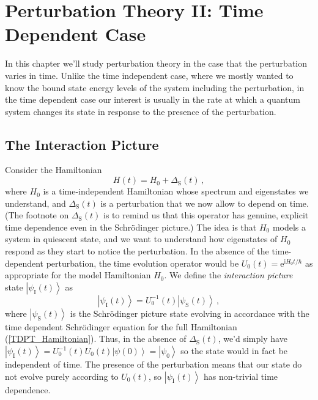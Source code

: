 \documentclass{article}
\theoremstyle{plain}\theoremheaderfont{\normalfont\itshape}\theorembodyfont{\rmfamily}\theoremseparator{.}\newtheorem*{rem}{Remark}\newtheorem*{ex}{Example}\newtheorem*{proof}{Proof}\newtheorem*{altp}{Alternative proof}
\theoremstyle{plain}\theoremheaderfont{\normalfont\bfseries}\theorembodyfont{\rmfamily}\theoremseparator{.}\newtheorem{thm}{Theorem}[section]\newtheorem{lem}[thm]{Lemma}\newtheorem{prop}[thm]{Proposition}\newtheorem*{cor}{Corollary}\newtheorem{defn}[thm]{Definition}\newtheorem{clm}[thm]{Claim}\newtheorem{clminproof}{Claim}
\theoremstyle{break}\theoremheaderfont{\normalfont\itshape}\theorembodyfont{\rmfamily}\theoremseparator{.\medskip}\newtheorem*{proofskip}{Proof}\newtheorem*{exs}{Examples}\newtheorem*{rems}{Remarks}
\theoremstyle{break}\theoremheaderfont{\normalfont\bfseries}\theorembodyfont{\rmfamily}\theoremseparator{.\medskip}\newtheorem{lemskip}[thm]{Lemma}\newtheorem{defnskip}[thm]{Definition}\newtheorem{propskip}[thm]{Proposition}\newtheorem{thmskip}[thm]{Theorem}
\numberwithin{equation}{section}
\newcommand{\ii}{\mathrm{i}}
\newcommand{\ee}{\mathrm{e}}
\newcommand{\ket}[1]{\left| #1 \right\rangle}
\renewcommand{\S}{_{\mathrm{S}}}
\newcommand{\I}{_{\mathrm{I}}}
\begin{document}
    \newpage
    \section{Perturbation Theory II: Time Dependent Case}\label{Chap:Time_Dependent_PT}
    In this chapter we'll study perturbation theory in the case that the perturbation varies in time. Unlike the time independent case, where we mostly wanted to know the bound state energy levels of the system including the perturbation, in the time dependent case our interest is usually in the rate at which a quantum system changes its state in response to the presence of the perturbation.

    \subsection{The Interaction Picture}
    Consider the Hamiltonian
    \begin{equation}\label{TDPT_Hamiltonian}
        H(t)=H_0+\Delta\S(t)\,,
    \end{equation}
    where \(H_0\) is a time-independent Hamiltonian whose spectrum and eigenstates we understand, and \(\Delta\S(t)\) is a perturbation that we now allow to depend on time. (The footnote on \(\Delta\S(t)\) is to remind us that this operator has genuine, explicit time dependence even in the Schr\"{o}dinger picture.) The idea is that \(H_0\) models a system in quiescent state, and we want to understand how eigenstates of \(H_0\) respond as they start to notice the perturbation. In the absence of the time-dependent perturbation, the time evolution operator would be \(U_0(t) =\ee^{\ii H_0t/\hbar}\) as appropriate for the model Hamiltonian \(H_0\). We define the \textit{interaction picture} state \(\ket{\psi\I(t)}\) as
    \begin{equation}
        \ket{\psi\I(t)}=U_0^{-1}(t)\ket{\psi\S(t)}\,,
    \end{equation}
    where \(\ket{\psi\S(t)}\) is the Schr\"{o}dinger picture state evolving in accordance with the time dependent Schr\"{o}dinger equation for the full Hamiltonian (\ref{TDPT_Hamiltonian}). Thus, in the absence of \(\Delta\S(t)\), we'd simply have \(\ket{\psi\I(t)}=U_0^{-1}(t)U_0(t)\ket{\psi(0)}=\ket{\psi_0}\) so the state would in fact be independent of time. The presence of the perturbation means that our state do not evolve purely according to \(U_0(t)\), so \(\ket{\psi\I(t)}\) has non-trivial time dependence.
\end{document}
